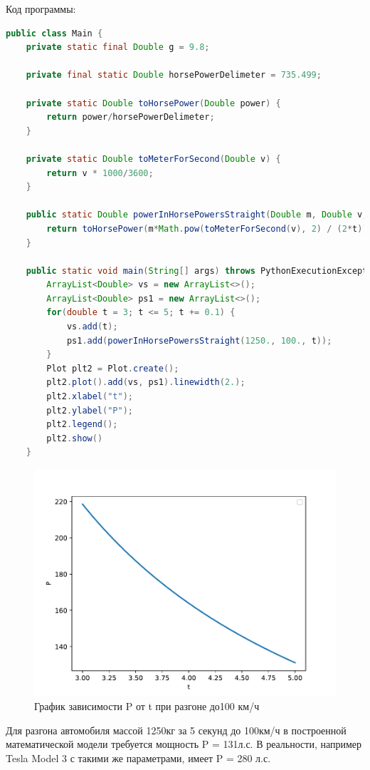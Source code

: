 \documentclass[a4paper, 14pt]{extarticle}
\begin{document}
			Код программы:
			\begin{lstlisting}[language=Java]
public class Main {
	private static final Double g = 9.8;
	
	private final static Double horsePowerDelimeter = 735.499;
	
	private static Double toHorsePower(Double power) {
		return power/horsePowerDelimeter;
	}
	
	private static Double toMeterForSecond(Double v) {
		return v * 1000/3600;
	}
	
	public static Double powerInHorsePowersStraight(Double m, Double v, Double t) {
		return toHorsePower(m*Math.pow(toMeterForSecond(v), 2) / (2*t));
	}
	
	public static void main(String[] args) throws PythonExecutionException, IOException {
		ArrayList<Double> vs = new ArrayList<>();
		ArrayList<Double> ps1 = new ArrayList<>();
		for(double t = 3; t <= 5; t += 0.1) {
			vs.add(t);
			ps1.add(powerInHorsePowersStraight(1250., 100., t));
		}
		Plot plt2 = Plot.create();
		plt2.plot().add(vs, ps1).linewidth(2.);
		plt2.xlabel("t");
		plt2.ylabel("P");
		plt2.legend();
		plt2.show()
	}
			\end{lstlisting}
			\begin{figure}[H]
				\centering
				\includegraphics[width = \linewidth]{fig3.pdf}
				\caption[.] {График зависимости P от t при разгоне до100 км/ч}
			\end{figure}
			Для разгона автомобиля массой 1250кг за 5 секунд до 100км/ч в 
			построенной математической модели требуется мощность P = 131л.с.
			В реальности, например Tesla Model 3 с такими же параметрами, имеет P = 280 л.с.
\end{document}
